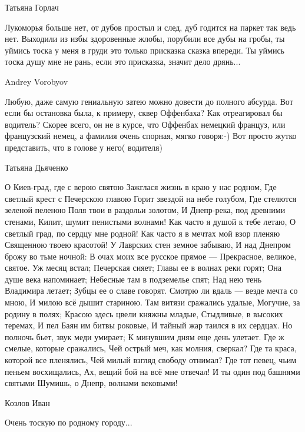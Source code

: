 Татьяна Горлач

Лукоморья больше нет, от дубов простыл и след, дуб годится на паркет так ведь
нет. Выходили из избы здоровенные жлобы, порубили все дубы на гробы, ты уймись
тоска у меня в груди это только присказка сказка впереди. Ты уймись тоска душу
мне не рань, если это присказка, значит дело дрянь...

Andrey Vorobyov

Любую, даже самую гениальную затею можно довести до полного абсурда. Вот если
бы остановка была, к примеру, сквер Оффенбаха? Как отреагировал бы водитель?
Скорее всего, он не в курсе, что Оффенбах немецкий француз, или французский
немец, а фамилия очень спорная, мягко говоря:-) Вот просто жутко представить,
что в голове у него( водителя)

Татьяна Дьяченко

О Киев-град, где с верою святою
Зажглася жизнь в краю у нас родном,
Где светлый крест с Печерскою главою
Горит звездой на небе голубом,
Где стелются зеленой пеленою
Поля твои в раздольи золотом,
И Днепр-река, под древними стенами,
Кипит, шумит пенистыми волнами!
Как часто я душой к тебе летаю,
О светлый град, по сердцу мне родной!
Как часто я в мечтах мой взор пленяю
Священною твоею красотой!
У Лаврских стен земное забываю,
И над Днепром брожу во тьме ночной:
В очах моих все русское прямое —
Прекрасное, великое, святое.
Уж месяц встал; Печерская сияет;
Главы ее в волнах реки горят;
Она душе века напоминает;
Небесные там в подземелье спят;
Над нею тень Владимира летает;
Зубцы ее о славе говорят.
Смотрю ли вдаль — везде мечта со мною,
И милою всё дышит стариною.
Там витязи сражались удалые,
Могучие, за родину в полях;
Красою здесь цвели княжны младые,
Стыдливые, в высоких теремах,
И пел Баян им битвы роковые,
И тайный жар таился в их сердцах.
Но полночь бьет, звук меди умирает;
К минувшим дням еще день улетает.
Где ж смелые, которые сражались,
Чей острый меч, как молния, сверкал?
Где та краса, которой все пленялись,
Чей милый взгляд свободу отнимал?
Где тот певец, чьим пеньем восхищались,
Ах, вещий бой на всё мне отвечал!
И ты один под башнями святыми
Шумишь, о Днепр, волнами вековыми!

Козлов Иван

Очень тоскую по родному городу...
